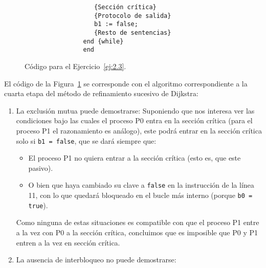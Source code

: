 \begin{ejercicio}
\begin{figure}[H]
\begin{multicols}{2}
\begin{verbatim}
                   {Sección crítica}
                   {Protocolo de salida}
                   b1 := false;
                   {Resto de sentencias}
                end {while}
                end
            \end{verbatim}
        \end{multicols}
        \caption{Código para el Ejercicio~\ref{ej:2.3}.}
        \label{fig:cod_3}
    \end{figure}
    El código de la Figura~\ref{fig:cod_3} se corresponde con el algoritmo correspondiente a la cuarta etapa del método de refinamiento sucesivo de Dijkstra:
    \begin{enumerate}[label=(\alph*)]
        \item La exclusión mutua puede demostrarse:
            Suponiendo que nos interesa ver las condiciones bajo las cuales el proceso P0 entra en la sección crítica (para el proceso P1 el razonamiento es análogo), este podrá entrar en la sección crítica solo si \verb|b1 = false|, que se dará siempre que:
            \begin{itemize}
                \item El proceso P1 no quiera entrar a la sección crítica (esto es, que este pasivo).
                \item O bien que haya cambiado su clave a \verb|false| en la instrucción de la línea 11, con lo que quedará bloqueado en el bucle más interno (porque \verb|b0 = true|).
            \end{itemize}
            Como ninguna de estas situaciones es compatible con que el proceso P1 entre a la vez con P0 a la sección crítica, concluimos que es imposible que P0 y P1 entren a la vez en sección crítica.
        \item La ausencia de interbloqueo no puede demostrarse:


\end{enumerate}
\end{ejercicio}
